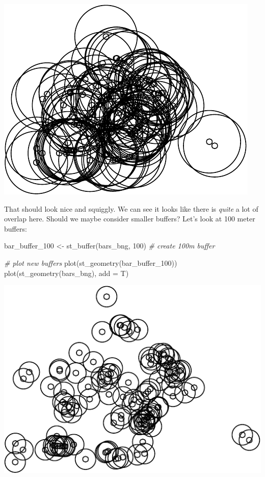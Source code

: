 \documentclass[
]{book}
\newenvironment{Shaded}{\begin{snugshade}}{\end{snugshade}}
\newcommand{\AttributeTok}[1]{\textcolor[rgb]{0.77,0.63,0.00}{#1}}
\newcommand{\CommentTok}[1]{\textcolor[rgb]{0.56,0.35,0.01}{\textit{#1}}}
\newcommand{\DecValTok}[1]{\textcolor[rgb]{0.00,0.00,0.81}{#1}}
\newcommand{\FunctionTok}[1]{\textcolor[rgb]{0.00,0.00,0.00}{#1}}
\newcommand{\NormalTok}[1]{#1}
\newcommand{\OtherTok}[1]{\textcolor[rgb]{0.56,0.35,0.01}{#1}}
\begin{document}
\includegraphics{crime_mapping_files/figure-latex/plot_buffers-1.pdf}

That should look nice and squiggly. We can see it looks like there is \emph{quite} a lot of overlap here. Should we maybe consider smaller buffers? Let's look at 100 meter buffers:

\begin{Shaded}
\begin{Highlighting}[]
\NormalTok{bar\_buffer\_100 }\OtherTok{\textless{}{-}} \FunctionTok{st\_buffer}\NormalTok{(bars\_bng, }\DecValTok{100}\NormalTok{) }\CommentTok{\# create 100m buffer}

\CommentTok{\# plot new buffers}
\FunctionTok{plot}\NormalTok{(}\FunctionTok{st\_geometry}\NormalTok{(bar\_buffer\_100))}
\FunctionTok{plot}\NormalTok{(}\FunctionTok{st\_geometry}\NormalTok{(bars\_bng), }\AttributeTok{add =}\NormalTok{ T)}
\end{Highlighting}
\end{Shaded}

\includegraphics{crime_mapping_files/figure-latex/smaller_buffers-1.pdf}
\end{document}
